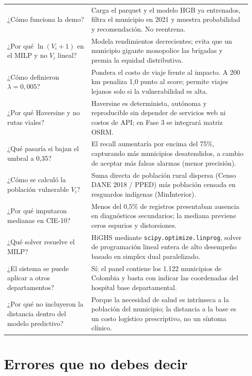 \documentclass[11pt,a4paper]{article}
\newcommand{\code}[1]{\texttt{#1}}
\begin{document}
\begin{longtable}{@{}L{5.95cm} L{10.05cm}@{}}
¿Cómo funciona la demo? &
Carga el parquet y el modelo HGB ya entrenados, filtra el municipio en 2021 y muestra probabilidad y recomendación. No reentrena. \\
¿Por qué $\ln(V_i + 1)$ en el MILP y no $V_i$ lineal? &
Modela rendimientos decrecientes; evita que un municipio gigante monopolice las brigadas y premia la equidad distributiva. \\
¿Cómo definieron $\lambda = 0{,}005$? &
Pondera el costo de viaje frente al impacto. A 200 km penaliza 1,0 punto al score; permite viajes lejanos solo si la vulnerabilidad es alta. \\
¿Por qué Haversine y no rutas viales? &
Haversine es determinista, autónoma y reproducible sin depender de servicios web ni costos de API; en Fase 3 se integrará matriz OSRM. \\
¿Qué pasaría si bajan el umbral a 0,35? &
El recall aumentaría por encima del 75\%, capturando más municipios desatendidos, a cambio de aceptar más falsas alarmas (menor precisión). \\
¿Cómo se calculó la población vulnerable $V_i$? &
Suma directa de población rural dispersa (Censo DANE 2018 / PPED) más población censada en resguardos indígenas (MinInterior). \\
¿Por qué imputaron medianas en CIE-10? &
Menos del 0,5\% de registros presentaban ausencia en diagnósticos secundarios; la mediana previene ceros espurios y distorsiones. \\
¿Qué solver resuelve el MILP? &
HiGHS mediante \code{scipy.optimize.linprog}, solver de programación lineal entera de alto desempeño basado en simplex dual paralelizado. \\
¿El sistema se puede aplicar a otros departamentos? &
Sí; el panel contiene los 1.122 municipios de Colombia y basta con indicar las coordenadas del hospital base departamental. \\
¿Por qué no incluyeron la distancia dentro del modelo predictivo? &
Porque la necesidad de salud es intrínseca a la población del municipio; la distancia a la base es un costo logístico prescriptivo, no un síntoma clínico. \\
\bottomrule
\end{longtable}

\section{Errores que no debes decir}
\end{document}
